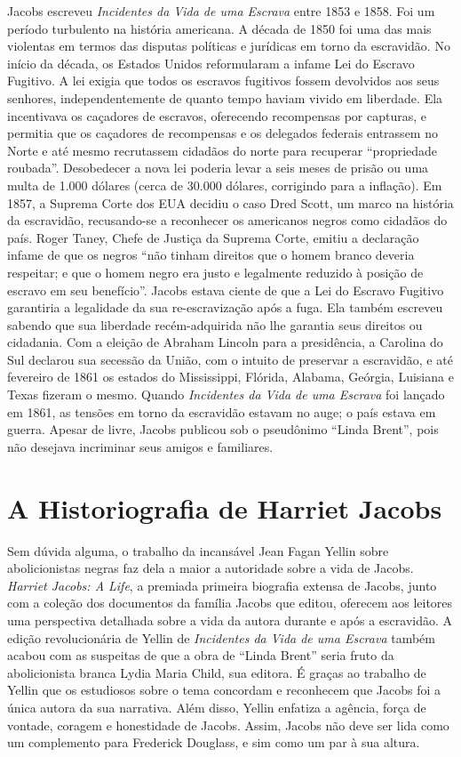 Jacobs escreveu \emph{Incidentes da Vida de uma Escrava} entre 1853 e
1858. Foi um período turbulento na história americana. A década de 1850
foi uma das mais violentas em termos das disputas políticas e jurídicas
em torno da escravidão. No início da década, os Estados Unidos
reformularam a infame Lei do Escravo Fugitivo. A lei exigia que todos os
escravos fugitivos fossem devolvidos aos seus senhores,
independentemente de quanto tempo haviam vivido em liberdade. Ela
incentivava os caçadores de escravos, oferecendo recompensas por
capturas, e permitia que os caçadores de recompensas e os delegados
federais entrassem no Norte e até mesmo recrutassem cidadãos do norte
para recuperar ``propriedade roubada''. Desobedecer a nova lei poderia
levar a seis meses de prisão ou uma multa de 1.000 dólares (cerca de
30.000 dólares, corrigindo para a inflação). Em 1857, a Suprema Corte
dos EUA decidiu o caso Dred Scott, um marco na história da escravidão,
recusando-se a reconhecer os americanos negros como cidadãos do país.
Roger Taney, Chefe de Justiça da Suprema Corte, emitiu a declaração
infame de que os negros ``não tinham direitos que o homem branco deveria
respeitar; e que o homem negro era justo e legalmente reduzido à posição
de escravo em seu benefício''. Jacobs estava ciente de que a Lei do
Escravo Fugitivo garantiria a legalidade da sua re-escravização após a
fuga. Ela também escreveu sabendo que sua liberdade recém-adquirida não
lhe garantia seus direitos ou cidadania. Com a eleição de Abraham
Lincoln para a presidência, a Carolina do Sul declarou sua secessão da
União, com o intuito de preservar a escravidão, e até fevereiro de 1861
os estados do Mississippi, Flórida, Alabama, Geórgia, Luisiana e Texas
fizeram o mesmo. Quando \emph{Incidentes da Vida de uma Escrava} foi
lançado em 1861, as tensões em torno da escravidão estavam no auge; o
país estava em guerra. Apesar de livre, Jacobs publicou sob o pseudônimo
``Linda Brent'', pois não desejava incriminar seus amigos e familiares.

\section{A Historiografia de Harriet Jacobs}

Sem dúvida alguma, o trabalho da incansável Jean Fagan Yellin sobre
abolicionistas negras faz dela a maior a autoridade sobre a vida de
Jacobs. \emph{Harriet Jacobs: A Life}, a premiada primeira biografia
extensa de Jacobs, junto com a coleção dos documentos da família Jacobs
que editou, oferecem aos leitores uma perspectiva detalhada sobre a vida
da autora durante e após a escravidão. A edição revolucionária de Yellin
de \emph{Incidentes da Vida de uma Escrava} também acabou com as
suspeitas de que a obra de ``Linda Brent'' seria fruto da abolicionista
branca Lydia Maria Child, sua editora. É graças ao trabalho de Yellin
que os estudiosos sobre o tema concordam e reconhecem que Jacobs foi a
única autora da sua narrativa. Além disso, Yellin enfatiza a agência,
força de vontade, coragem e honestidade de Jacobs. Assim, Jacobs não
deve ser lida como um complemento para Frederick Douglass, e sim como um
par à sua altura.

